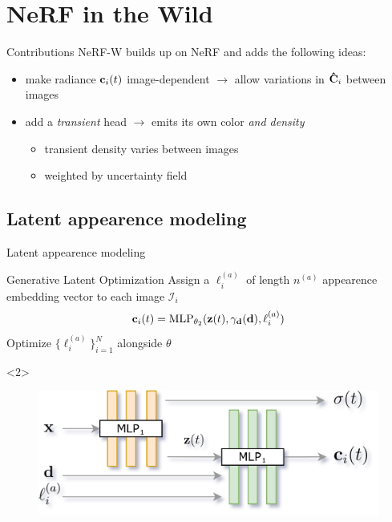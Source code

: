 \documentclass[aspectratio=1610]{beamer}
\begin{document}
\section{NeRF in the Wild}
\begin{frame}{Contributions}
    NeRF-W builds up on NeRF and adds the following ideas:
    \bigskip
    \pause
    \begin{itemize}
        \item make radiance \(\vb{c}_i (t)\) image-dependent \(\rightarrow\) allow variations in \(\vb{\hat{C}}_i\) between images 
        \pause 
        \item add a \emph{transient} head \(\rightarrow\) emits its own color \emph{and density}
        \begin{itemize}
            \item transient density varies between images
            \item weighted by uncertainty field
        \end{itemize}
    \end{itemize}
\end{frame}

\subsection*{Latent appearence modeling}
\begin{frame}{Latent appearence modeling}
    \begin{block}{Generative Latent Optimization}
        Assign a \(\ell_i^{(a)}\) of length \(n^{(a)}\) appearence embedding vector to each image \(\mathcal{I}_i\)
        \begin{equation*}
            \vb{c}_i(t) = \textrm{MLP}_{\theta_2} (\vb{z}(t), \gamma_{\vb{d}}(\vb{d}), \ell_i^{(a)})
        \end{equation*}
        Optimize \(\{\ell_i^{(a)}\}_{i=1}^N\) alongside \(\theta\)
    \end{block}
    \begin{onlyenv}<2>
        \bigskip
        \begin{figure}[H]
            \centering
            \includegraphics[width=.65\textwidth,keepaspectratio]{nerfa-architecture.png}
        \end{figure}
    \end{onlyenv}
\end{frame}
\end{document}
